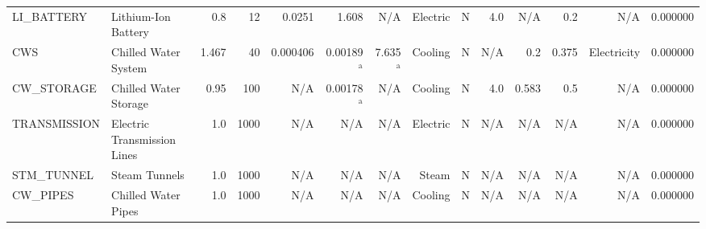 \begin{tabular}{llrrrrrrrrrrrr}
  LI\_BATTERY &         Lithium-Ion Battery &        0.8 &        12 &                  0.0251 &                   1.608 &                    N/A &      Electric &               N &                      4.0 &       N/A &                 0.2 &          N/A &                     0.000000 \\
         CWS &        Chilled Water System &      1.467 &        40 &                0.000406 &                0.00189$^\text{a}$ &                 7.635$^\text{a}$ & Cooling &               N &                      N/A &       0.2 &               0.375 &  Electricity &                     0.000000 \\
  CW\_STORAGE &       Chilled Water Storage &       0.95 &       100 &                     N/A &                0.00178$^\text{a}$ &                    N/A & Cooling &               N &                      4.0 &     0.583 &                 0.5 &          N/A &                     0.000000 \\
TRANSMISSION & Electric Transmission Lines &        1.0 &      1000 &                     N/A &                     N/A &                    N/A &      Electric &               N &                      N/A &       N/A &                 N/A &          N/A &                     0.000000 \\
  STM\_TUNNEL &               Steam Tunnels &        1.0 &      1000 &                     N/A &                     N/A &                    N/A &         Steam &               N &                      N/A &       N/A &                 N/A &          N/A &                     0.000000 \\
    CW\_PIPES &         Chilled Water Pipes &        1.0 &      1000 &                     N/A &                     N/A &                    N/A & Cooling &               N &                      N/A &       N/A &                 N/A &          N/A &                     0.000000 \\
\bottomrule
\end{tabular}
